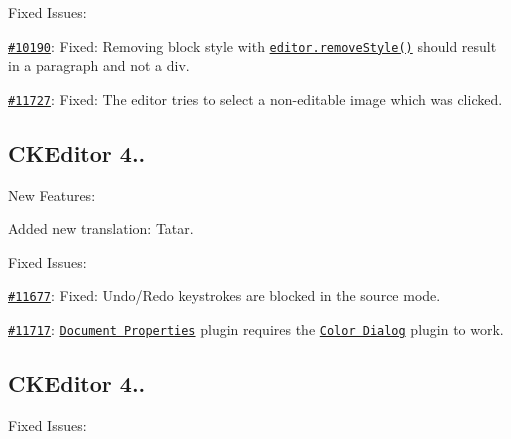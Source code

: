 Fixed Issues\+:


\begin{DoxyItemize}
\item \href{http://dev.ckeditor.com/ticket/10190}{\tt \#10190}\+: Fixed\+: Removing block style with \href{http://docs.ckeditor.com/#!/api/CKEDITOR.editor-method-removeStyle}{\tt {\ttfamily editor.\+remove\+Style()}} should result in a paragraph and not a div.
\item \href{http://dev.ckeditor.com/ticket/11727}{\tt \#11727}\+: Fixed\+: The editor tries to select a non-\/editable image which was clicked.
\end{DoxyItemize}

\subsection*{C\+K\+Editor 4..}

New Features\+:


\begin{DoxyItemize}
\item Added new translation\+: Tatar.
\end{DoxyItemize}

Fixed Issues\+:


\begin{DoxyItemize}
\item \href{http://dev.ckeditor.com/ticket/11677}{\tt \#11677}\+: Fixed\+: Undo/\+Redo keystrokes are blocked in the source mode.
\item \href{http://dev.ckeditor.com/ticket/11717}{\tt \#11717}\+: \href{http://ckeditor.com/addon/docprops}{\tt Document Properties} plugin requires the \href{http://ckeditor.com/addon/colordialog}{\tt Color Dialog} plugin to work.
\end{DoxyItemize}

\subsection*{C\+K\+Editor 4..}

Fixed Issues\+:


